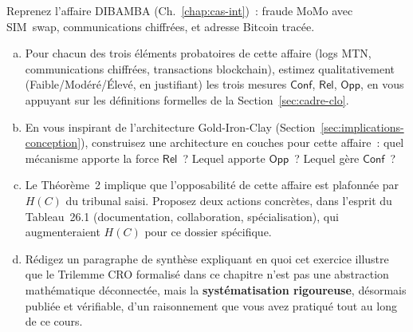 \begin{boxexo}[title={\ding{45}\quad Exercice~26.3 --- Application intégrative à une affaire du cours \niveauexpert}]
Reprenez l'affaire DIBAMBA (Ch.~\ref{chap:cas-int})~: fraude MoMo
avec SIM~swap, communications chiffrées, et adresse Bitcoin tracée.
\begin{enumerate}[(a)]
    \item Pour chacun des trois éléments probatoires de cette
          affaire (logs MTN, communications chiffrées, transactions
          blockchain), estimez qualitativement (Faible/Modéré/Élevé,
          en justifiant) les trois mesures $\mathsf{Conf}$,
          $\mathsf{Rel}$, $\mathsf{Opp}$, en vous appuyant sur les
          définitions formelles de la Section~\ref{sec:cadre-clo}.
    \item En vous inspirant de l'architecture Gold-Iron-Clay
          (Section~\ref{sec:implications-conception}), construisez
          une architecture en couches pour cette affaire~: quel
          mécanisme apporte la force $\mathsf{Rel}$~? Lequel apporte
          $\mathsf{Opp}$~? Lequel gère $\mathsf{Conf}$~?
    \item Le Théorème~2 implique que l'opposabilité de cette
          affaire est plafonnée par $H(C)$ du tribunal saisi.
          Proposez deux actions concrètes, dans l'esprit du
          Tableau~26.1 (documentation, collaboration, spécialisation),
          qui augmenteraient $H(C)$ pour ce dossier spécifique.
    \item Rédigez un paragraphe de synthèse expliquant en quoi
          cet exercice illustre que le Trilemme CRO formalisé
          dans ce chapitre n'est pas une abstraction mathématique
          déconnectée, mais la \textbf{systématisation rigoureuse},
          désormais publiée et vérifiable, d'un raisonnement que
          vous avez pratiqué tout au long de ce cours.
\end{enumerate}
\end{boxexo}

\bigskip

